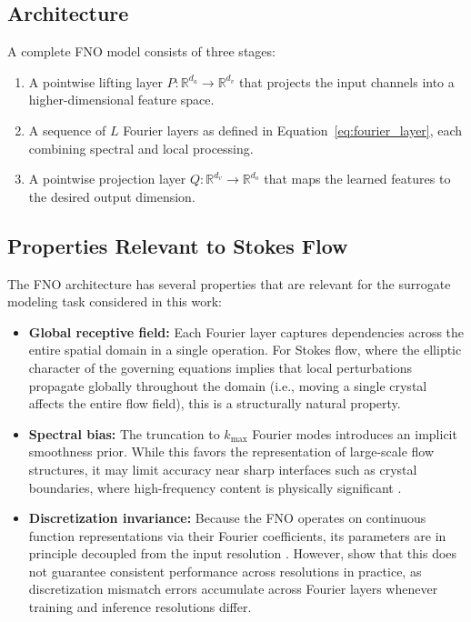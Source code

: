 \subsection{Architecture}

A complete FNO model consists of three stages:
\begin{enumerate}
    \item A pointwise lifting layer $P: \mathbb{R}^{d_a} \to \mathbb{R}^{d_v}$ that projects the input channels into a higher-dimensional feature space.
    \item A sequence of $L$ Fourier layers as defined in Equation~\eqref{eq:fourier_layer}, each combining spectral and local processing.
    \item A pointwise projection layer $Q: \mathbb{R}^{d_v} \to \mathbb{R}^{d_o}$ that maps the learned features to the desired output dimension.
\end{enumerate}

\subsection{Properties Relevant to Stokes Flow}

The FNO architecture has several properties that are relevant for the
surrogate modeling task considered in this work:

\begin{itemize}
    \item \textbf{Global receptive field:} Each Fourier layer captures
    dependencies across the entire spatial domain in a single operation. For
    Stokes flow, where the elliptic character of the governing equations
    implies that local perturbations propagate globally throughout the domain
    (i.e., moving a single crystal affects the entire flow field), this is a
    structurally natural property.
    \item \textbf{Spectral bias:} The truncation to $k_{\max}$ Fourier modes
    introduces an implicit smoothness prior. While this favors the
    representation of large-scale flow structures, it may limit accuracy near
    sharp interfaces such as crystal boundaries, where high-frequency content
    is physically significant \parencite{qin_toward_2024}.
    \item \textbf{Discretization invariance:} Because the FNO operates on
    continuous function representations via their Fourier coefficients, its
    parameters are in principle decoupled from the input resolution
    \parencite{li_fourier_2021}. However, \textcite{gao2025discretizationinvariance}
    show that this does not guarantee consistent performance across resolutions
    in practice, as discretization mismatch errors accumulate across Fourier
    layers whenever training and inference resolutions differ.
\end{itemize}

